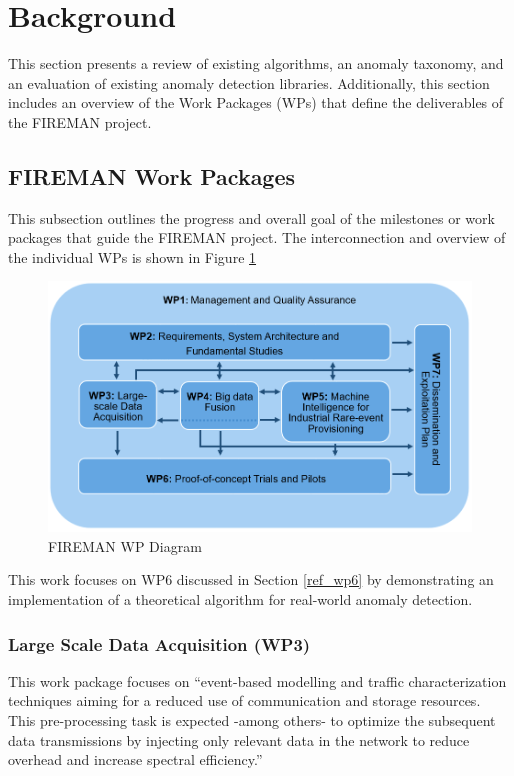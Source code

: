 \section{Background}
This section presents a review of existing algorithms, an anomaly taxonomy, and an evaluation of existing anomaly detection libraries. Additionally, this section includes an overview of the Work Packages (WPs) that define the deliverables of the FIREMAN project.

\subsection{FIREMAN Work Packages}
\label{ref_FIREMAN_WP}

This subsection outlines the progress and overall goal of the milestones or work packages that guide the FIREMAN project. The interconnection and overview of the individual WPs is shown in Figure \ref{fig:wp-diagram}

\begin{figure}[H]
    \includegraphics[width=\textwidth]{Images/FIREMAN_pert_diagram.png}
    \caption{FIREMAN WP Diagram \parencite{fireman-homepage}}
    \label{fig:wp-diagram}
\end{figure}

This work focuses on WP6 discussed in Section \ref{ref_wp6} by demonstrating an implementation of a theoretical algorithm for real-world anomaly detection.

\subsubsection{Large Scale Data Acquisition (WP3)}

This work package focuses on \enquote{event-based modelling and traffic characterization techniques aiming for a reduced use of communication and storage resources.
This pre-processing task is expected -among others- to optimize the subsequent data transmissions by injecting only relevant data in the network to reduce overhead and increase spectral efficiency.} 

